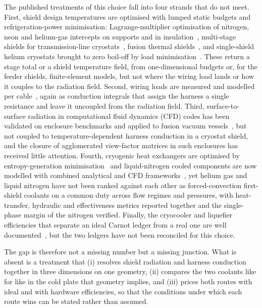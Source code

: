 \documentclass[preprint,12pt]{elsarticle}
\begin{document}
The published treatments of this choice fall into four strands that do not meet. First,
shield design temperatures are optimised with lumped static budgets and
refrigeration-power minimisation: Lagrange-multiplier optimisation of nitrogen, neon and
helium-gas intercepts on supports and in insulation~\cite{Li1990SMESIntercepts},
multi-stage shields for transmission-line cryostats~\cite{Miles2008MultiStageShields},
fusion thermal shields~\cite{Groth2024DEMOFeederShield, Barone2020DTTShield}, and
single-shield helium cryostats brought to zero boil-off by load
minimisation~\cite{Zhang2024ZeroLHeCryostat}. These return a stage total or a shield
temperature field, from one-dimensional budgets or, for the feeder shields, finite-element
models, but not where the wiring load lands or how it couples to the radiation field. Second, wiring loads are measured and modelled per
cable~\cite{6-Krinner2019CryogenicSetup, 22-Raicu2025CryogenicThermal,
Snodgrass2022RegeneratorLoads}, again as conduction integrals that assign the harness a
single resistance and leave it uncoupled from the radiation field. Third, surface-to-surface
radiation in computational fluid dynamics (CFD) codes has been validated on enclosure benchmarks and applied to fusion
vacuum vessels~\cite{Koncar2018CFDRadiation}, but not coupled to temperature-dependent
harness conduction in a cryostat shield, and the closure of agglomerated view-factor
matrices in such enclosures has received little attention. Fourth, cryogenic heat exchangers are
optimised by entropy-generation minimisation~\cite{Lerou2005EGMHX,
Wilhelmsen2018CryoHXExergy, 41-Bejan1996EGM} and liquid-nitrogen cooled components are now
modelled with combined analytical and CFD frameworks~\cite{Gacnik2025LN2Terminals}, yet
helium gas and liquid nitrogen have not been ranked against each other as forced-convection
first-shield coolants on a common duty across flow regimes and pressures, with
heat-transfer, hydraulic and effectiveness metrics reported together and the
single-phase margin of the nitrogen verified. Finally, the cryocooler and liquefier
efficiencies that separate an ideal Carnot ledger from a real one are well
documented~\cite{Radebaugh2009Cryocoolers, Claudet2010LHCExergy,
Karabuga2018N2Liquefaction}, but the two ledgers have not been reconciled for this choice.

The gap is therefore not a missing number but a missing junction. What is absent is a
treatment that (i) resolves shield radiation and harness conduction together in three
dimensions on one geometry, (ii) compares the two coolants like for like in the cold plate
that geometry implies, and (iii) prices both routes with ideal and with hardware
efficiencies, so that the conditions under which each route wins can be stated rather than
assumed.
\end{document}
